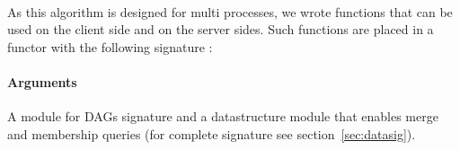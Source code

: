 \paragraph{} As this algorithm is designed for multi processes, we wrote functions that can be used on the client side and on the server sides. Such functions are placed in a functor with the following signature :
\paragraph{Arguments} A module for DAGs signature and a datastructure module that enables merge and membership queries (for complete signature see section~\ref{sec:datasig}).
